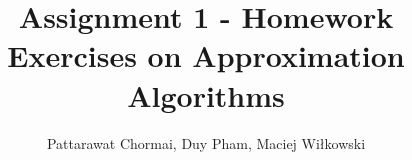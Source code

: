 \documentclass[12pt]{article}
\begin{document}
\title{Assignment 1 - Homework Exercises on Approximation Algorithms}
\author{Pattarawat Chormai, Duy Pham, Maciej Wiłkowski}
\maketitle









\end{document}
